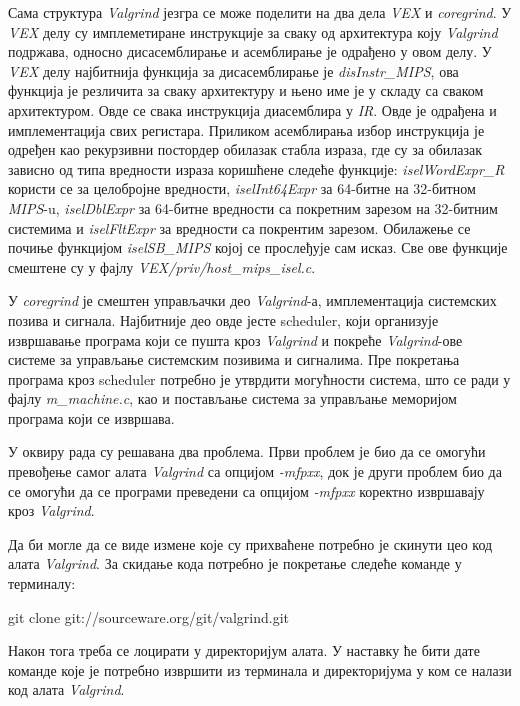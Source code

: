\documentclass[12pt,oneside]{memoir}
\begin{document}
\indent Сама структура \textit{Valgrind} језгра се може поделити на два дела \textit{VEX} и \textit{coregrind}. У \textit{VEX} делу су имплеметиране инструкције за сваку од архитектура коју \textit{Valgrind} подржава, односно дисасемблирање и асемблирање је одрађено у овом делу. У \textit{VEX} делу најбитнија функција за дисасемблирање је \textit{disInstr\_MIPS}, ова функција је резличита за сваку архитектуру и њено име је у складу са сваком архитектуром. Овде се свака инструкција диасемблира у \textit{IR}. Овде је одрађена и имплементација свих регистара. Приликом асемблирања избор инструкција је одређен као рекурзивни постордер обилазак стабла израза, где су за обилазак зависно од типа вредности израза коришћене следеће функције: \textit{iselWordExpr\_R} користи се за целобројне вредности,  \textit{iselInt64Expr} за 64-битне на 32-битном \textit{MIPS}-u, \textit{iselDblExpr} за 64-битне вредности са покретним зарезом на 32-битним системима и \textit{iselFltExpr} за вредности са покрентим зарезом. Обилажење се почиње функцијом \textit{iselSB\_MIPS} којој се прослеђује сам исказ. Све ове функције смештене су у фајлу \textit{VEX/priv/host\_mips\_isel.c}.


\indent У \textit{coregrind} је смештен управљачки део \textit{Valgrind}-а, имплементација системских позива и сигнала. Најбитније део овде јесте scheduler, који организује извршавање програма који се пушта кроз \textit{Valgrind} и покреће \textit{Valgrind}-ове системе за управљање системским позивима и сигналима. Пре покретања програма кроз scheduler потребно је утврдити могућности система, што се ради у фајлу \textit{m\_machine.c}, као и постављање система за управљање меморијом програма који се извршава.

\indent У оквиру рада су решавана два проблема. Први проблем је био да се омогући превођење самог алата \textit{Valgrind} са опцијом \textit{-mfpxx}, док је други проблем био да се омогући да се програми преведени са опцијом \textit{-mfpxx} коректно извршавају кроз \textit{Valgrind}.

\indent Да би могле да се виде измене које су прихваћене потребно је скинути цео код алата \textit{Valgrind}. За скидање кода потребно је покретање следеће команде у терминалу:

\begin{center}
git clone git://sourceware.org/git/valgrind.git
\end{center}

Након тога треба се лоцирати у директоријум алата. У наставку ће бити дате команде које је потребно извршити из терминала и директоријума у ком се налази код алата \textit{Valgrind}.
\end{document}
